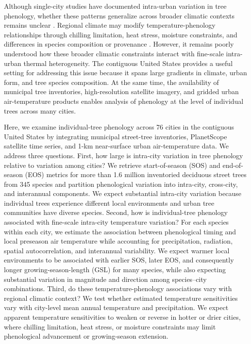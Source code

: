 Although single-city studies have documented intra-urban variation in tree phenology, whether these patterns generalize across broader climatic contexts remains unclear \citep{Crawford2024ERL, Katz2019STOTEN, Parece2018UrbanSci, Zipper2016ERL, Wu2025NatCommun}. Regional climate may modify temperature-phenology relationships through chilling limitation, heat stress, moisture constraints, and differences in species composition or provenance \citep{Chen2020NCC, Chuine2010Science, Jochner2015EnvironmentalPollution, Fu2015Nature, Li2019NatEcoEvol, Zhou2022NCC}. However, it remains poorly understood how these broader climatic constraints interact with fine-scale intra-urban thermal heterogeneity. The contiguous United States provides a useful setting for addressing this issue because it spans large gradients in climate, urban form, and tree species composition. At the same time, the availability of municipal tree inventories, high-resolution satellite imagery, and gridded urban air-temperature products enables analysis of phenology at the level of individual trees across many cities. 

Here, we examine individual-tree phenology across 76 cities in the contiguous United States by integrating municipal street-tree inventories, PlanetScope satellite time series, and 1-km near-surface urban air-temperature data. We address three questions. First, how large is intra-city variation in tree phenology relative to variation among cities? We retrieve start-of-season (SOS) and end-of-season (EOS) metrics for more than 1.6 million inventoried deciduous street trees from 345 species and partition phenological variation into intra-city, cross-city, and interannual components. We expect substantial intra-city variation because individual trees experience different local environments and urban tree communities have diverse species. Second, how is individual-tree phenology associated with fine-scale intra-city temperature variation? For each species within each city, we estimate the association between phenological timing and local preseason air temperature while accounting for precipitation, radiation, spatial autocorrelation, and interannual variability. We expect warmer local environments to be associated with earlier SOS, later EOS, and consequently longer growing-season-length (GSL) for many species, while also expecting substantial variation in magnitude and direction among species–city combinations. Third, do these temperature-phenology associations vary with regional climatic context? We test whether estimated temperature sensitivities vary with city-level mean annual temperature and precipitation. We expect apparent temperature sensitivities to weaken or reverse in hotter or drier cities, where chilling limitation, heat stress, or moisture constraints may limit phenological advancement or growing-season extension.